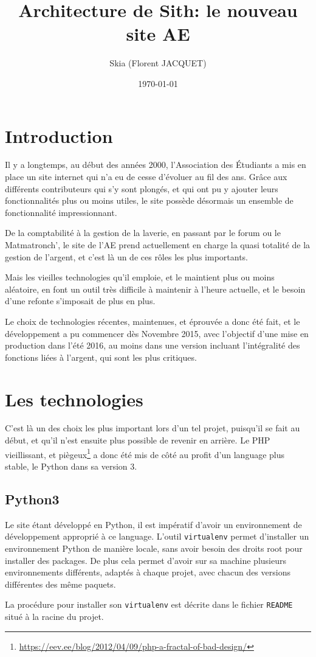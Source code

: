 \documentclass[a4paper]{report}
\title{Architecture de Sith: le nouveau site AE}
\author{Skia (Florent JACQUET)}
\date{\today}
\begin{document}
\tableofcontents
\listoffigures

\chapter*{Introduction}
\par Il y a longtemps, au début des années 2000, l'Association des Étudiants a mis en place un site internet qui n'a eu de
cesse d'évoluer au fil des ans. Grâce aux différents contributeurs qui s'y sont plongés, et qui ont pu y ajouter leurs
fonctionnalités plus ou moins utiles, le site possède désormais un ensemble de fonctionnalité impressionnant.
\par De la comptabilité à la gestion de la laverie, en passant par le forum ou le Matmatronch', le site de l'AE prend
actuellement en charge la quasi totalité de la gestion de l'argent, et c'est là un de ces rôles les plus importants.
\par Mais les vieilles technologies qu'il emploie, et le maintient plus ou moins aléatoire, en font un outil très difficile à
maintenir à l'heure actuelle, et le besoin d'une refonte s'imposait de plus en plus.
\par Le choix de technologies récentes, maintenues, et éprouvée a donc été fait, et le développement a pu commencer dès
Novembre 2015, avec l'objectif d'une mise en production dans l'été 2016, au moins dans une version incluant
l'intégralité des fonctions liées à l'argent, qui sont les plus critiques.

\chapter{Les technologies}
\label{cha:les_technologies}
\par C'est là un des choix les plus important lors d'un tel projet, puisqu'il se fait au début, et qu'il n'est ensuite plus
possible de revenir en arrière. Le PHP vieillissant, et
piègeux\footnote{\url{https://eev.ee/blog/2012/04/09/php-a-fractal-of-bad-design/}} a donc été mis de côté au profit
d'un language plus stable, le Python dans sa version 3.

\section{Python3}
\label{sec:python3}
\par Le site étant développé en Python, il est impératif d'avoir un environnement de développement approprié à ce
language. L'outil \verb#virtualenv# permet d'installer un environnement Python de manière locale, sans avoir besoin des
droits root pour installer des packages. De plus cela permet d'avoir sur sa machine plusieurs environnements différents,
adaptés à chaque projet, avec chacun des versions différentes des même paquets.
\par La procédure pour installer son \verb#virtualenv# est décrite dans le fichier \verb#README# situé à la racine du
projet.
\end{document}
